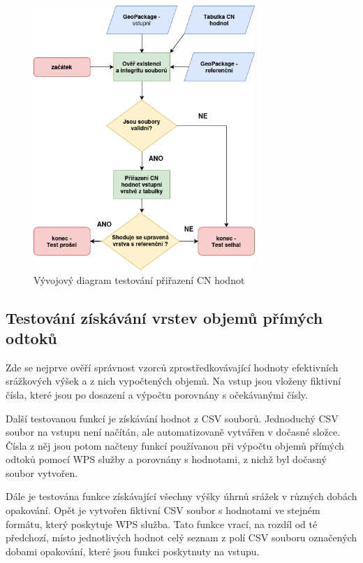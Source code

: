 \documentclass[a4paper,oneside,12pt]{book}
\begin{document}
\begin{figure}[H] \label{obr21}
\centering
\includegraphics[height=10cm]{pictures/tst4.png}
\caption{Vývojový diagram testování přiřazení CN hodnot}
\label{fig:test4}
\end{figure}


\subsection{Testování získávání vrstev objemů přímých odtoků} \label{test_runoff}
\hspace{10mm} Zde se nejprve ověří správnost vzorců zprostředkovávající hodnoty efektivních srážkových výšek a z nich vypočtených objemů. Na vstup jsou vloženy fiktivní čísla, které jsou po dosazení a výpočtu porovnány s očekávanými čísly.

\hspace{10mm} Další testovanou funkcí je získávání hodnot z CSV souborů. Jednoduchý CSV soubor na vstupu není načítán, ale automatizovaně vytvářen v dočasné složce. Čísla z něj jsou potom načteny funkcí používanou při výpočtu objemů přímých odtoků pomocí WPS služby a porovnány s hodnotami, z nichž byl dočasný soubor vytvořen.

\hspace{10mm} Dále je testována funkce získávající všechny výšky úhrnů srážek v různých dobách opakování. Opět je vytvořen fiktivní CSV soubor s hodnotami ve stejném formátu, který poskytuje WPS služba. Tato funkce vrací, na rozdíl od té předchozí, místo jednotlivých hodnot celý seznam z polí CSV souboru označených dobami opakování, které jsou funkci poskytnuty na vstupu.
\end{document}
